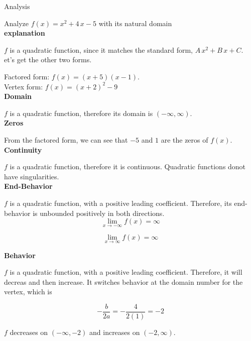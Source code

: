 \documentclass{ximera}
\begin{document}
\begin{example}   
Analysis


Analyze $f(x) = x^2 + 4 \, x - 5$ with its natural domain    \\ 




\textbf{explanation}


$f$ is a quadratic function, since it matches the standard form, $A \, x^2 + B \, x + C$. \\


et's get the other two forms.

Factored form: $f(x) = (x+5)(x-1)$. \\

Vertex form: $f(x) = (x+2)^2 - 9$ \\




\textbf{Domain}

$f$ is a quadratic function, therefore its domain is $(-\infty, \infty)$. \\



\textbf{Zeros}

From the factored form, we can see that $-5$ and $1$ are the zeros of $f(x)$.  \\


\textbf{Continuity}

$f$ is a quadratic function, therefore it is continuous. Quadratic functions donot have singularities.\\



\textbf{End-Behavior}

$f$ is a quadratic function, with a positive leading coefficient. Therefore, its end-behavior is unbounded positively in both directions. \\

\[
\lim\limits_{x \to -\infty} f(x) = \infty 
\]


\[
\lim\limits_{x \to \infty} f(x) = \infty 
\]




\textbf{Behavior}

$f$ is a quadratic function, with a positive leading coefficient. Therefore, it will decreas and then increase. It switches behavior at the domain number for the vertex, which is


\[
-\frac{b}{2a} = -\frac{4}{2(1)} = -2
\]


$f$ decreases on $(-\infty, -2)$ and increases on $(-2, \infty )$. \\





\end{example}
\end{document}
